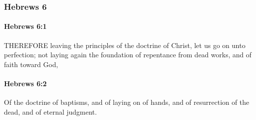 	\subsubsection{Hebrews 6} %
		\label{HEBREWS-6}
		
		\paragraph{Hebrews 6:1} %
			\label{HEBREWS-6-1}

			THEREFORE leaving the principles of the doctrine of Christ, let us go on unto perfection; not laying again the foundation of repentance from dead works, and of faith toward God,

			\begin{framed}
		\scriptsize
				\begin{compactdesc}
					\item[SBLG] 
				\end{compactdesc}
			\end{framed}

		\paragraph{Hebrews 6:2} %
			\label{HEBREWS-6-2}

			Of the doctrine of baptisms, and of laying on of hands, and of resurrection of the dead, and of eternal judgment.

